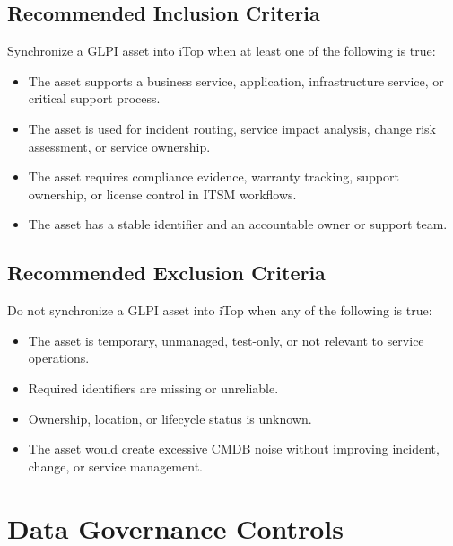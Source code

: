\documentclass[11pt]{article}
\begin{document}
\subsection{Recommended Inclusion Criteria}

Synchronize a GLPI asset into iTop when at least one of the following is true:

\begin{itemize}
  \item The asset supports a business service, application, infrastructure service, or critical support process.
  \item The asset is used for incident routing, service impact analysis, change risk assessment, or service ownership.
  \item The asset requires compliance evidence, warranty tracking, support ownership, or license control in ITSM workflows.
  \item The asset has a stable identifier and an accountable owner or support team.
\end{itemize}

\subsection{Recommended Exclusion Criteria}

Do not synchronize a GLPI asset into iTop when any of the following is true:

\begin{itemize}
  \item The asset is temporary, unmanaged, test-only, or not relevant to service operations.
  \item Required identifiers are missing or unreliable.
  \item Ownership, location, or lifecycle status is unknown.
  \item The asset would create excessive CMDB noise without improving incident, change, or service management.
\end{itemize}

\section{Data Governance Controls}
\end{document}

